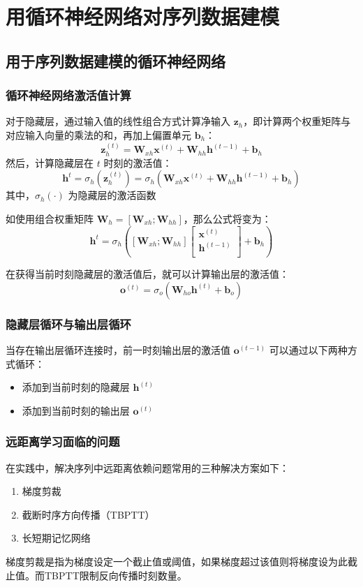 \chapter{用循环神经网络对序列数据建模\label{Ch15}}
\section{用于序列数据建模的循环神经网络}
\subsection{循环神经网络激活值计算}
对于隐藏层，通过输入值的线性组合方式计算净输入 $\bm{z}_h$，即计算两个权重矩阵与对应输入向量的乘法的和，再加上偏置单元 $\bm{b}_h$：
\begin{equation}
    \bm{z}_h^{(t)} = \bm{W}_{xh}\bm{x}^{(t)}+\bm{W}_{hh}\bm{h}^{(t-1)}+\bm{b}_h
\end{equation}
然后，计算隐藏层在 $t$ 时刻的激活值：
\begin{equation}
    \bm{h}^{t}=\sigma_h(\bm{z}_h^{(t)})=\sigma_h(\bm{W}_{xh}\bm{x}^{(t)}+\bm{W}_{hh}\bm{h}^{(t-1)}+\bm{b}_h)
\end{equation}
其中，$\sigma_h(\cdot)$ 为隐藏层的激活函数

如使用组合权重矩阵 $\bm{W}_h=\left[\bm{W}_{xh};\bm{W}_{hh}\right]$，那么公式将变为：
\begin{equation}
    \bm{h}^{t}=\sigma_h\left(\left[\bm{W}_{xh};\bm{W}_{hh}\right]
    \begin{bmatrix}
        \bm{x}^{(t)}   \\
        \bm{h}^{(t-1)} \\
    \end{bmatrix}+\bm{b}_h\right)
\end{equation}

在获得当前时刻隐藏层的激活值后，就可以计算输出层的激活值：
\begin{equation}
    \bm{o}^{(t)}=\sigma_o(\bm{W}_{ho}\bm{h}^{(t)}+\bm{b}_o)
\end{equation}
\subsection{隐藏层循环与输出层循环}
当存在输出层循环连接时，前一时刻输出层的激活值  $\bm{o}^{(t-1)}$ 可以通过以下两种方式循环：
\begin{itemize}
    \item 添加到当前时刻的隐藏层 $\bm{h}^{(t)}$
    \item 添加到当前时刻的输出层 $\bm{o}^{(t)}$
\end{itemize}
\subsection{远距离学习面临的问题}
在实践中，解决序列中远距离依赖问题常用的三种解决方案如下：
\begin{enumerate}
    \item 梯度剪裁
    \item 截断时序方向传播（TBPTT）
    \item 长短期记忆网络
\end{enumerate}
梯度剪裁是指为梯度设定一个截止值或阈值，如果梯度超过该值则将梯度设为此截止值。而TBPTT限制反向传播时刻数量。